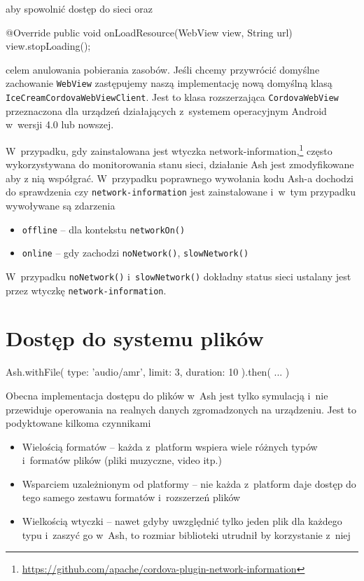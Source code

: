 \documentclass[brudnopis]{xmgr}
\begin{document}
\noindent aby spowolnić dostęp do sieci oraz

\begin{javacode}
   @Override
   public void onLoadResource(WebView view, String url) {
       view.stopLoading();
   }
\end{javacode}

\noindent celem anulowania pobierania zasobów. Jeśli chcemy przywrócić domyślne zachowanie \texttt{WebView} zastępujemy naszą implementację nową domyślną klasą \texttt{IceCreamCordovaWebViewClient}. Jest to klasa rozszerzająca \texttt{CordovaWebView} przeznaczona dla urządzeń działających z~systemem operacyjnym Android w~wersji 4.0 lub nowszej.

W~przypadku, gdy zainstalowana jest wtyczka network-information,\footnote{ \url{https://github.com/apache/cordova-plugin-network-information} } często wykorzystywana do monitorowania stanu sieci, działanie Ash jest zmodyfikowane aby z nią współgrać. W~przypadku poprawnego wywołania kodu Ash-a dochodzi do sprawdzenia czy \texttt{network-information} jest zainstalowane i~w~tym przypadku wywoływane są zdarzenia

\begin{itemize}
  \item \texttt{offline} -- dla kontekstu \texttt{networkOn()} 
  \item \texttt{online} -- gdy zachodzi \texttt{noNetwork()}, \texttt{slowNetwork()}
\end{itemize}

W~przypadku \texttt{noNetwork()} i~\texttt{slowNetwork()} dokładny status sieci ustalany jest przez wtyczkę \texttt{network-information}.

\section{Dostęp do systemu plików}

\begin{javascriptcode}
Ash.withFile({ 
    type: 'audio/amr', 
    limit: 3, 
    duration: 10
 }).then( ... )
\end{javascriptcode}

Obecna implementacja dostępu do plików w~Ash jest tylko symulacją i~nie przewiduje operowania na realnych danych zgromadzonych na urządzeniu. Jest to podyktowane kilkoma czynnikami

\begin{itemize}
  \item Wielością formatów -- każda z~platform wspiera wiele różnych typów i~formatów plików (pliki muzyczne, video itp.) 
  \item Wsparciem uzależnionym od platformy -- nie każda z~platform daje dostęp do tego samego zestawu formatów i~rozszerzeń plików
  \item Wielkością wtyczki -- nawet gdyby uwzględnić tylko jeden plik dla każdego typu i~zaszyć go w~Ash, to rozmiar biblioteki utrudnił by korzystanie z~niej
\end{itemize}
\end{document}
